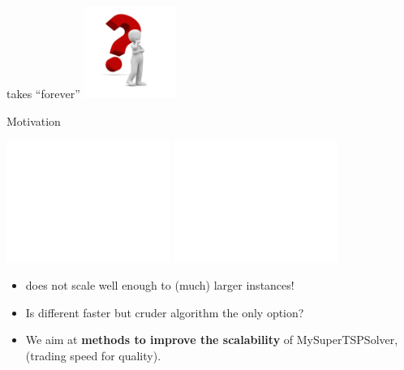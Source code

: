 \documentclass[aspectratio=1610]{beamer}
\newcommand{\important}[1]{{\color{green!60!black}#1}}
\begin{document}
\begin{frame}
\begin{minipage}{0.45\textwidth}
\begin{center}
			\bigskip
			 \alert{takes ``forever''}
			\includegraphics[width=3cm]{graphics/question-mark.jpg}
		\end{center}
	\end{minipage}

\end{frame}

\begin{frame}{Motivation}

	\begin{center}
	\includegraphics<1>[width=0.4\textwidth]{graphics/hybrid-motivation.pdf}
	\includegraphics<2>[width=0.4\textwidth]{graphics/hybrid-motivation2.pdf}
	\end{center}

	\begin{itemize}
		\item 
		 does not scale well enough to (much) larger instances!
	
		\item \alert{Is different faster but cruder algorithm the only option?}
		\item<2> We aim at \important{\bf methods to improve the scalability} of MySuperTSPSolver,\\ (trading speed for quality).
	\end{itemize}
\end{frame}
\end{document}

